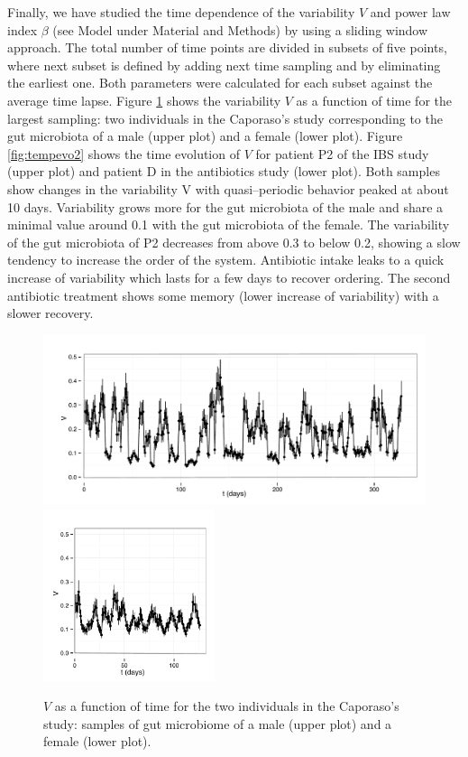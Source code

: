 Finally, we have studied the time dependence of the variability $V$ and power law index $\beta$ (see Model under Material and Methods) by using a sliding window approach. The total number of time points are divided in subsets of five points, where next subset is defined by adding next time sampling and by eliminating the earliest one. Both parameters were calculated for each subset against the average time lapse. Figure \ref{fig:tempevo1} shows the variability  $V$ as a function of time for the largest sampling: two individuals in the Caporaso's study\cite{moving} corresponding to the gut microbiota of a male (upper plot) and a female (lower plot). Figure \ref{fig:tempevo2} shows the time evolution of $V$ for patient P2 of the IBS study\cite{IBS} (upper plot) and patient D in the antibiotics study\cite{antibiotic} (lower plot). Both samples show changes in the variability V with quasi--periodic behavior peaked at about 10 days. Variability grows more for the gut microbiota of the male and share a minimal value around 0.1 with the gut microbiota of the female. The variability of the gut microbiota of P2 decreases from above 0.3 to below 0.2, showing a slow tendency to increase the order of the system.  Antibiotic intake leaks to a quick increase of variability which lasts for a few days to recover ordering. The second antibiotic treatment shows some memory (lower increase of variability) with a slower recovery.

\begin{figure}
	\includegraphics[width=1.0\textwidth]{results/sliwin/male_mov.pdf}
	\hspace*{3mm}\includegraphics[width=0.448\textwidth]{results/sliwin/female_mov.pdf}
\caption{$V$ as a function of time for the two individuals in the Caporaso's study\cite{moving}: samples of gut microbiome of a male (upper plot) and a female (lower plot).}
\label{fig:tempevo1}
\end{figure}

